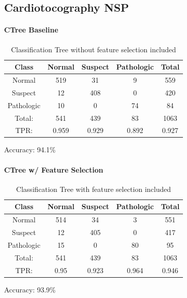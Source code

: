 \subsection{Cardiotocography NSP}
\paragraph{CTree Baseline}
\begin{table}[h!]
	\centering
	\begin{tabular}{|c|c|c|c|c|}
		\hline
		Class&Normal&Suspect&Pathologic&Total\\\hline
Normal&519&31&9&559\\
Suspect&12&408&0&420\\
Pathologic&10&0&74&84\\\hline
Total:&541&439&83&1063\\
TPR:&0.959&0.929&0.892&0.927\\
		\hline
	\end{tabular}
	\caption[CardioNSP: Classification Tree without Feature Selection Confusion Matrix]{Classification Tree without feature selection included}
	\label{tab:cardioNSPctreebase}
\end{table}
Accuracy: 94.1\%
\paragraph{CTree w/ Feature Selection}
\begin{table}[h!]
	\centering
	\begin{tabular}{|c|c|c|c|c|}
		\hline
		Class&Normal&Suspect&Pathologic&Total\\\hline
Normal&514&34&3&551\\
Suspect&12&405&0&417\\
Pathologic&15&0&80&95\\\hline
Total:&541&439&83&1063\\
TPR:&0.95&0.923&0.964&0.946\\

		\hline
	\end{tabular}
	\caption[CardioNSP: Classification Tree with Feature Selection Confusion Matrix]{Classification Tree with feature selection included}
	\label{tab:cardioNSPctree}
\end{table}
Accuracy: 93.9\%

